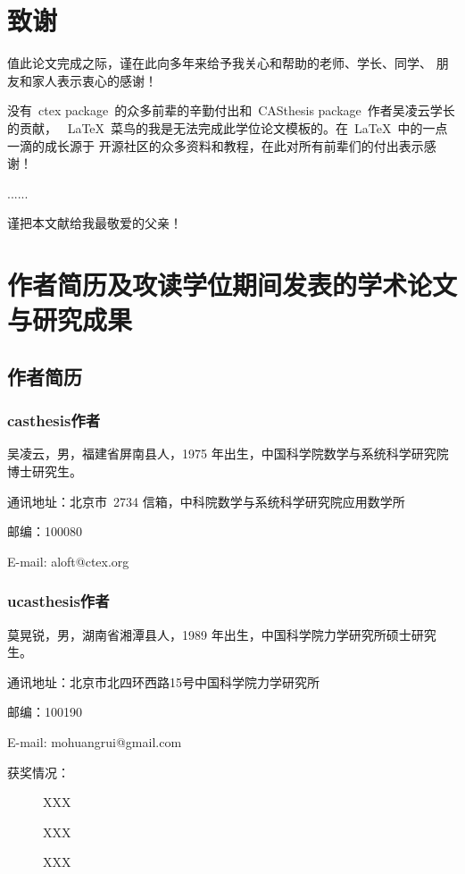 \chapter{致\quad 谢}

值此论文完成之际，谨在此向多年来给予我关心和帮助的老师、学长、同学、
朋友和家人表示衷心的感谢！

没有~ctex package~的众多前辈的辛勤付出和~CASthesis package~作者吴凌云学长的贡献，
~\LaTeX{}~菜鸟的我是无法完成此学位论文模板的。在~\LaTeX{}~中的一点一滴的成长源于
开源社区的众多资料和教程，在此对所有前辈们的付出表示感谢！

......

谨把本文献给我最敬爱的父亲！




\chapter{作者简历及攻读学位期间发表的学术论文与研究成果}

\section*{作者简历}

\subsection*{casthesis作者}

吴凌云，男，福建省屏南县人，1975 年出生，中国科学院数学与系统科学研究院博士研究生。

通讯地址：北京市~2734 信箱，中科院数学与系统科学研究院应用数学所

邮编：100080

E-mail: aloft@ctex.org

\subsection*{ucasthesis作者}

莫晃锐，男，湖南省湘潭县人，1989 年出生，中国科学院力学研究所硕士研究生。

通讯地址：北京市北四环西路15号中国科学院力学研究所

邮编：100190

E-mail: mohuangrui@gmail.com

\begin{description}
 \item[获奖情况：] XXX
 \item[\quad\quad\quad\quad\quad] XXX
 \item[\quad\quad\quad\quad\quad] XXX
\end{description}


